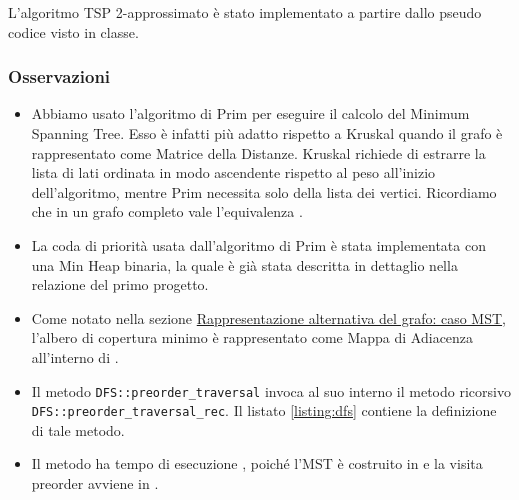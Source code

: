 \noindent L'algoritmo TSP 2-approssimato è stato implementato a partire dallo pseudo codice visto in classe. \\

\subsubsection{Osservazioni}

\begin{itemize}
    \item Abbiamo usato l'algoritmo di Prim per eseguire il calcolo del Minimum Spanning Tree. Esso è infatti più adatto rispetto a Kruskal quando il grafo è rappresentato come Matrice della Distanze. Kruskal richiede di estrarre la lista di lati ordinata in modo ascendente rispetto al peso all'inizio dell'algoritmo, mentre Prim necessita solo della lista dei vertici. Ricordiamo che in un grafo completo vale l'equivalenza \complexityCompleteGraph{}. \\

    \item La coda di priorità usata dall'algoritmo di Prim è stata implementata con una Min Heap binaria, la quale è già stata descritta in dettaglio nella relazione del primo progetto. \\

    \item Come notato nella sezione \hyperref[alternative-graph-representation]{Rappresentazione alternativa del grafo: caso MST}, l'albero di copertura minimo è rappresentato come Mappa di Adiacenza all'interno di . \\

    \item Il metodo \texttt{DFS::preorder_traversal} invoca al suo interno il metodo ricorsivo \\
    \texttt{DFS::preorder_traversal_rec}. Il listato \ref{listing:dfs} contiene la definizione di tale metodo. \\

    \item Il metodo ha tempo di esecuzione \complexityMSTTwpApproxTime{}, poiché l'MST è costruito in \complexityPrimTime{} e la visita preorder avviene in \complexityDFSPreorderTime{}.
\end{itemize}

